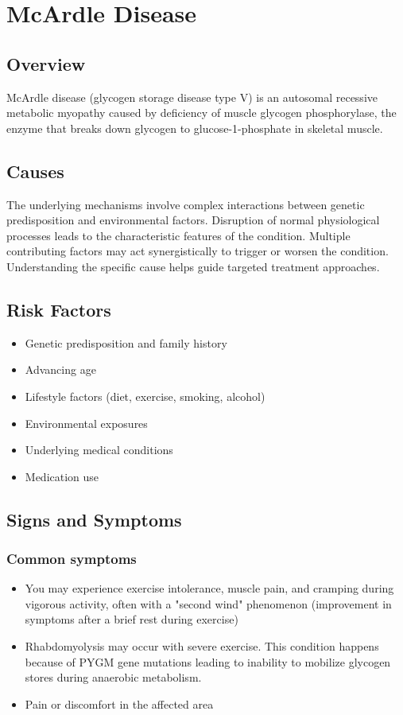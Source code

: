 \chapter{McArdle Disease}
\label{sec:McArdle Disease}

\section{Overview}
McArdle disease (glycogen storage disease type V) is an autosomal recessive metabolic myopathy caused by deficiency of muscle glycogen phosphorylase, the enzyme that breaks down glycogen to glucose-1-phosphate in skeletal muscle.
\section{Causes}
The underlying mechanisms involve complex interactions between genetic predisposition and environmental factors. Disruption of normal physiological processes leads to the characteristic features of the condition. Multiple contributing factors may act synergistically to trigger or worsen the condition. Understanding the specific cause helps guide targeted treatment approaches.
\section{Risk Factors}


\begin{itemize}[noitemsep]
  \item Genetic predisposition and family history
  \item Advancing age
  \item Lifestyle factors (diet, exercise, smoking, alcohol)
  \item Environmental exposures
  \item Underlying medical conditions
  \item Medication use
\end{itemize}
\section{Signs and Symptoms}

\subsection{Common symptoms}
\begin{itemize}[noitemsep]
  \item You may experience exercise intolerance, muscle pain, and cramping during vigorous activity, often with a "second wind" phenomenon (improvement in symptoms after a brief rest during exercise)
  \item Rhabdomyolysis may occur with severe exercise. This condition happens because of PYGM gene mutations leading to inability to mobilize glycogen stores during anaerobic metabolism.
  \item Pain or discomfort in the affected area
  \end{itemize}

